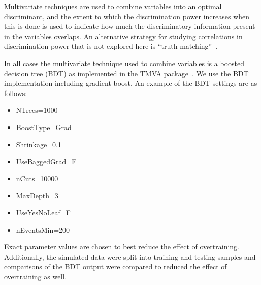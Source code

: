 \noindent

Multivariate techniques are used to combine variables into an optimal
discriminant, and the extent to which the discrimination power
increases when this is done is used to indicate how much the
discriminatory information present in the variables overlaps. An
alternative strategy for studying correlations in discrimination power
that is not explored here  is ``truth
matching''~\cite{Larkoski:2014pca}.

In all cases the multivariate technique used to combine variables is a boosted decision tree (BDT) as implemented in the TMVA package~\cite{Hocker:2007ht}.
We use the BDT implementation including gradient boost.  
An example of the BDT settings are as follows: 
\begin{itemize}
\item NTrees=1000
\item BoostType=Grad
\item Shrinkage=0.1
\item UseBaggedGrad=F
\item nCuts=10000
\item MaxDepth=3
\item UseYesNoLeaf=F
\item nEventsMin=200
\end{itemize}
Exact parameter values are chosen to best reduce the effect of overtraining.
Additionally, the simulated data were split into training and testing samples and comparisons of the BDT output were compared to reduced the effect of overtraining as well.  
